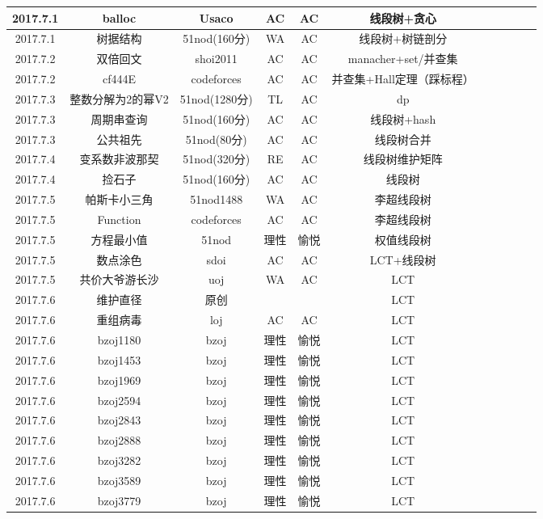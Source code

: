 \documentclass[landscape]{article}
\begin{document}
\begin{longtable}{ccccccccccc}
  \hline
  2017.7.1 & balloc & Usaco & AC & AC & 线段树+贪心\\
  \hline
  2017.7.1 & 树据结构 & 51nod(160分) & WA & AC & 线段树+树链剖分\\
  \hline
  2017.7.2 & 双倍回文 & shoi2011 & AC & AC & manacher+set/并查集\\
  \hline
  2017.7.2 & cf444E & codeforces & AC & AC & 并查集+Hall定理（踩标程）\\
  \hline
  2017.7.3 & 整数分解为2的幂V2 & 51nod(1280分) & TL & AC & dp\\
  \hline
  2017.7.3 & 周期串查询 & 51nod(160分) & AC & AC & 线段树+hash\\
  \hline
  2017.7.3 & 公共祖先 & 51nod(80分) & AC & AC & 线段树合并\\
  \hline
  2017.7.4 & 变系数非波那契 & 51nod(320分) & RE & AC & 线段树维护矩阵\\
  \hline
  2017.7.4 & 捡石子 & 51nod(160分) & AC & AC & 线段树\\
  \hline
  2017.7.5 & 帕斯卡小三角 & 51nod1488 & WA & AC & 李超线段树\\
  \hline
  2017.7.5 & Function & codeforces & AC & AC & 李超线段树\\
  \hline
  2017.7.5 & 方程最小值 & 51nod & 理性 & 愉悦 & 权值线段树\\
  \hline
  2017.7.5 & 数点涂色 & sdoi & AC & AC & LCT+线段树\\
  \hline
  2017.7.5 & 共价大爷游长沙 & uoj & WA & AC & LCT\\
  \hline
  2017.7.6 & 维护直径 & 原创 & & & LCT\\
  \hline
  2017.7.6 & 重组病毒 & loj & AC & AC & LCT\\
  \hline
  2017.7.6 & bzoj1180 & bzoj & 理性 & 愉悦 & LCT\\
  \hline
  2017.7.6 & bzoj1453 & bzoj & 理性 & 愉悦 & LCT\\
  \hline
  2017.7.6 & bzoj1969 & bzoj & 理性 & 愉悦 & LCT\\
  \hline
  2017.7.6 & bzoj2594 & bzoj & 理性 & 愉悦 & LCT\\
  \hline
  2017.7.6 & bzoj2843 & bzoj & 理性 & 愉悦 & LCT\\
  \hline
  2017.7.6 & bzoj2888 & bzoj & 理性 & 愉悦 & LCT\\
  \hline
  2017.7.6 & bzoj3282 & bzoj & 理性 & 愉悦 & LCT\\
  \hline
  2017.7.6 & bzoj3589 & bzoj & 理性 & 愉悦 & LCT\\
  \hline
  2017.7.6 & bzoj3779 & bzoj & 理性 & 愉悦 & LCT\\

\end{longtable}
\end{document}
